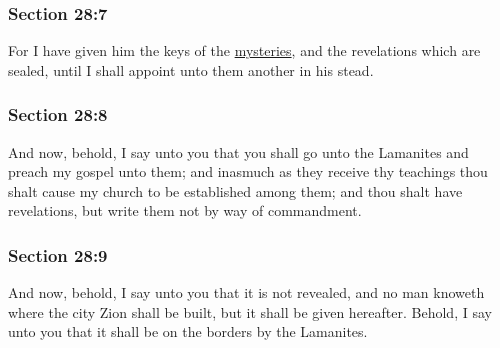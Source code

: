 	\subsubsection{Section 28:7} %
		\label{DC28-7}

		For I have given him the keys of the \hyperref[MYSTERY]{mysteries}, and the revelations which are sealed, until I shall appoint unto them another in his stead.


	\subsubsection{Section 28:8} %
		\label{DC28-8}

		And now, behold, I say unto you that you shall go unto the Lamanites and preach my gospel unto them; and inasmuch as they receive thy teachings thou shalt cause my church to be established among them; and thou shalt have revelations, but write them not by way of commandment.


	\subsubsection{Section 28:9} %
		\label{DC28-9}

		And now, behold, I say unto you that it is not revealed, and no man knoweth where the city Zion shall be built, but it shall be given hereafter.  Behold, I say unto you that it shall be on the borders by the Lamanites.


